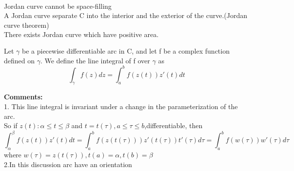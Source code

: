 \\Jordan curve cannot be space-filling
\\A Jordan curve separate C into the interior and the exterior of the curve.(Jordan curve theorem)
\\There exists Jordan curve which  have positive area.
\begin{definition}{}
Let $ \gamma $ be a piecewise differentiable arc in C, and let f be a complex function defined on $ \gamma $. We define the line integral of f over $ \gamma $ as $$
    \int_{\gamma}f(z)dz=\int_{a}^{b}f(z(t))z'(t)dt 
$$
\end{definition} 
\textbf{Comments:}
\\1. This line integral is invariant under a change in the parameterization of the arc.
\\So if $ z(t):\alpha\leq t\leq \beta $ and $ t=t(\tau), a\leq \tau \leq b$,differentiable, then$$
\int_{\alpha}^{\beta}f(z(t))z'(t)dt =\int_{a}^{b}f(z(t(\tau)))z'(t(\tau))t'(\tau)d\tau=\int_{a}^{b}f(w(\tau))w'(\tau)d\tau
$$  where $ w(\tau)=z(t(\tau)) ,t(a)=\alpha,t(b)=\beta$
\\2.In this discussion arc have an orientation
